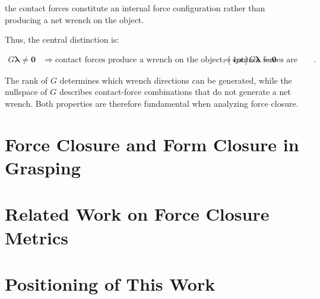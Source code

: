 the contact forces constitute an internal force configuration rather than producing a net wrench on the object.

Thus, the central distinction is:

\begin{equation}
\boxed{
\begin{array}{ll}
G\boldsymbol{\lambda}\neq\mathbf{0}
&\Rightarrow
\text{contact forces produce a wrench on the object},[4pt]
G\boldsymbol{\lambda}=\mathbf{0}
&\Rightarrow
\text{contact forces are internal}.
\end{array}
}
\end{equation}

The rank of $G$ determines which wrench directions can be generated, while the nullspace of $G$ describes contact-force combinations that do not generate a net wrench. Both properties are therefore fundamental when analyzing force closure.


\section{Force Closure and Form Closure in Grasping}

\section{Related Work on Force Closure Metrics}

\section{Positioning of This Work}

